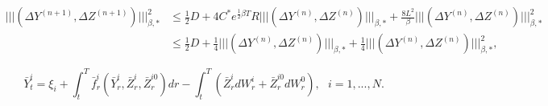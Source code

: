 \documentclass[10pt,a4paper]{amsart}
\newcommand{\trinm}[1]{\vert\!\vert\!\vert #1 \vert\!\vert\!\vert}
\begin{document}
\begin{align}
\trinm{(\Delta Y^{(n+1)},\Delta Z^{(n+1)})}_{\beta,*}^{2} &\leq \tfrac{1}{2}D + 4C^{*}e^{\tfrac{1}{2}\beta T}R\trinm{(\Delta Y^{(n)},\Delta Z^{(n)})}_{\beta,*} + \tfrac{8L^{2}}{\beta}\trinm{ (\Delta Y^{(n)},\Delta Z^{(n)})}_{\beta,*}^{2} \nonumber \\
&\leq \tfrac{1}{2}D +\tfrac{1}{4}\trinm{(\Delta Y^{(n)},\Delta Z^{(n)})}_{\beta,*} + \tfrac{1}{4}\trinm{(\Delta Y^{(n)},\Delta Z^{(n)})}_{\beta,*}^{2}, \label{equ:stab9}
\end{align}

\begin{equation}
\label{equ:gMF.1}
\bar{Y}_{t}^{i} = \xi_{i} + \int_{t}^{T}\bar{f}_{r}^{i}(\bar{Y}_{r}^{i},\bar{Z}_{r}^{i},\bar{Z}_{r}^{i0})dr - \int_{t}^{T}(\bar{Z}_{r}^{i}dW_{r}^{i} + \bar{Z}_{r}^{i0}dW_{r}^{0}), \ \  \ i=1,...,N.
\end{equation}
\end{document}
